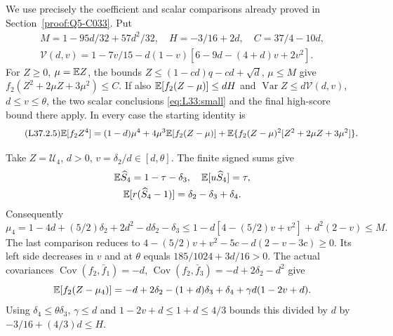 We use precisely the coefficient and scalar comparisons already proved
in Section~\ref{proof:Q5-C033}. Put
\[
\begin{gathered}
M=1-95d/32+57d^2/32,\quad H=-3/16+2d,\quad C=37/4-10d,\\
\mathcal V(d,v)=1-7v/15-d(1-v)[6-9d-(4+d)v+2v^2].
\end{gathered}
\]
For $Z\ge0$, $\mu=\mathbb E Z$, the bounds
$Z\le(1-cd)q-cd+\sqrt d$, $\mu\le M$ give
$f_2(Z^2+2\mu Z+3\mu^2)\le C$.
If also $\mathbb E[f_2(Z-\mu)]\le dH$ and
$\operatorname{Var}Z\le d\mathcal V(d,v)$, $d\le v\le\theta$,
the two scalar conclusions \eqref{eq:L33:small} and the final high-score
bound there apply. In every case the starting identity is
\begin{equation}\tag{L37.2.5}\label{eq:L37:expansion}
\mathbb E[f_2Z^4]=(1-d)\mu^4+4\mu^3\mathbb E[f_2(Z-\mu)]
+\mathbb E\{f_2(Z-\mu)^2[Z^2+2\mu Z+3\mu^2]\}.
\end{equation}

Take $Z=\mathcal U_4$, $d>0$, $v=\delta_2/d\in[d,\theta]$.
The finite signed sums give
\[
\begin{gathered}
\mathbb E\widehat S_4=1-\tau-\delta_3,\quad \mathbb E[u\widehat S_4]=\tau,\\
\mathbb E[r(\widehat S_4-1)]=\delta_2-\delta_3+\delta_4.
\end{gathered}
\]
Consequently
\begin{equation}\tag{L37.3.1}\label{eq:L37:mean4}
\mu_4=1-4d+(5/2)\delta_2+2d^2-d\delta_2-\delta_3
\le1-d[4-(5/2)v+v^2]+d^2(2-v)\le M.
\end{equation}
The last comparison reduces to
$4-(5/2)v+v^2-5c-d(2-v-3c)\ge0$.
Its left side decreases in $v$ and at $\theta$ equals
$185/1024+3d/16>0$. The actual covariances
$\operatorname{Cov}(f_2,\bar f_1)=-d$,
$\operatorname{Cov}(f_2,\bar f_3)=-d+2\delta_2-d^2$ give
\[
\mathbb E[f_2(Z-\mu_4)]=-d+2\delta_2-(1+d)\delta_3+\delta_4
+\gamma d(1-2v+d).
\]
Using $\delta_4\le\theta\delta_3$, $\gamma\le d$ and
$1-2v+d\le1+d\le4/3$ bounds this divided by $d$ by
$-3/16+(4/3)d\le H$.


